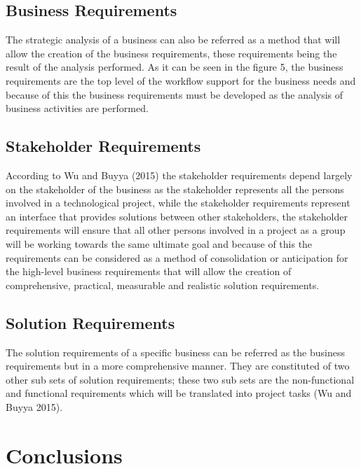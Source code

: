 \subsection{Business Requirements}

The strategic analysis of a business can also be referred as a method that will allow the creation of the business
requirements, these requirements being the result of the analysis performed. As it can be seen in the figure 5,
the business requirements are the top level of the workflow support for the business needs and because of this
the business requirements must be developed as the analysis of business activities are performed.

\subsection{Stakeholder Requirements}

According to Wu and Buyya (2015) the stakeholder requirements depend largely on the stakeholder of the business
as the stakeholder represents all the persons involved in a technological project, while the stakeholder
requirements represent an interface that provides solutions between other stakeholders, the stakeholder
requirements will ensure that all other persons involved in a project as a group will be working towards
the same ultimate goal and because of this the requirements can be considered as a method of consolidation
or anticipation for the high-level business requirements that will allow the creation of comprehensive,
practical, measurable and realistic solution requirements.

\subsection{Solution Requirements}

The solution requirements of a specific business can be referred as the business requirements but in a more
comprehensive manner. They are constituted of two other sub sets of solution requirements; these two sub
sets are the non-functional and functional requirements which will be translated into project tasks
(Wu and Buyya 2015).

\section{Conclusions}

